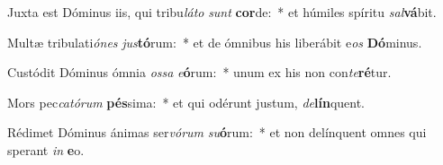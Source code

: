 \item Juxta est Dóminus iis, qui tribu\textit{lá}\textit{to} \textit{sunt} \textbf{cor}de:~* et húmiles spíritu \textit{sal}\textbf{vá}bit.
\item Multæ tribulati\textit{ó}\textit{nes} \textit{jus}\textbf{tó}rum:~* et de ómnibus his liberábit e\textit{os} \textbf{Dó}minus.
\item Custódit Dóminus ómnia \textit{os}\textit{sa} \textit{e}\textbf{ó}rum:~* unum ex his non con\textit{te}\textbf{ré}tur.
\item Mors pec\textit{ca}\textit{tó}\textit{rum} \textbf{pés}sima:~* et qui odérunt justum, \textit{de}\textbf{lín}quent.
\item Rédimet Dóminus ánimas ser\textit{vó}\textit{rum} \textit{su}\textbf{ó}rum:~* et non delínquent omnes qui sperant \textit{in} \textbf{e}o.
